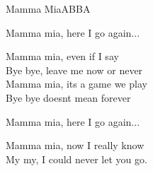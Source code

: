 \begin{song}{Mamma Mia}{ABBA}
\begin{guitar}
Mamma mia, here I go again...\\
\end{guitar}

\begin{guitar}
Mamma mia, even if I say\\
Bye bye, leave me now or never\\
Mamma mia, its a game we play\\
Bye bye doesnt mean forever\\
\end{guitar}

\begin{guitar}
Mamma mia, here I go again...\\
\end{guitar}

\begin{guitar}
Mamma mia, now I really know\\
My my, I could never let you go.\\
\end{guitar}
\end{song}
